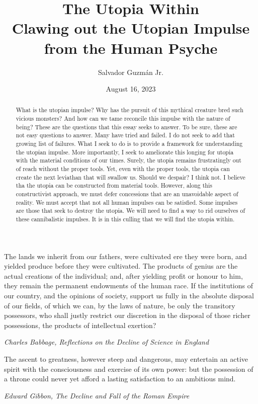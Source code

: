 \documentclass[12pt]{article}
\title{
The Utopia Within \\
\large Clawing out the Utopian Impulse from the Human Psyche}
\author{Salvador Guzm\'an Jr.}
\date{August 16, 2023}
\begin{document}
\maketitle
\pagebreak

\begin{abstract}
    What is the utopian impulse?
    Why has the pursuit of this mythical creature bred such vicious monsters?
    And how can we tame reconcile this impulse with the nature of being?
    These are the questions that this essay seeks to answer.
    To be sure, these are not easy questions to answer.
    Many have tried and failed.
    I do not seek to add that growing list of failures.
    What I seek to do is to provide a framework for understanding the utopian impulse.
    More importantly, I seek to ameliorate this longing for utopia with the material conditions of our times.
    Surely, the utopia remains frustratingly out of reach without the proper tools.
    Yet, even with the proper tools, the utopia can create the next leviathan that will swallow us.
    Should we despair?
    I think not.
    I believe tha the utopia can be constructed from material tools.
    However, along this constructivist approach, we must defer concessions that are an unavoidable aspect of reality.
    We must accept that not all human impulses can be satisfied.
    Some impulses are those that seek to destroy the utopia.
    We will need to find a way to rid ourselves of these cannibalistic impulses.
    It is in this culling that we will find the utopia within.
\end{abstract}

\pagebreak

\begin{center}
    \epigraph{
        The lands we inherit from our fathers, were cultivated ere they were born, and yielded produce before they were cultivated. The products of genius are the actual creations of the individual; and, after yielding profit or honour to him, they remain the permanent endowments of the human race. If the institutions of our country, and the opinions of society, support us fully in the absolute disposal of our fields, of which we can, by the laws of nature, be only the transitory possessors, who shall justly restrict our discretion in the disposal of those richer possessions, the products of intellectual exertion?    }{\textit{Charles Babbage, Reflections on the Decline of Science in England}}
    \epigraph{
        The ascent to greatness, however steep and dangerous, may entertain an active spirit with the consciousness and exercise of its own power: but the possession of a throne could never yet afford a lasting satisfaction to an ambitious mind.
    }{\textit{Edward Gibbon, The Decline and Fall of the Roman Empire}}
\end{center}
\end{document}
